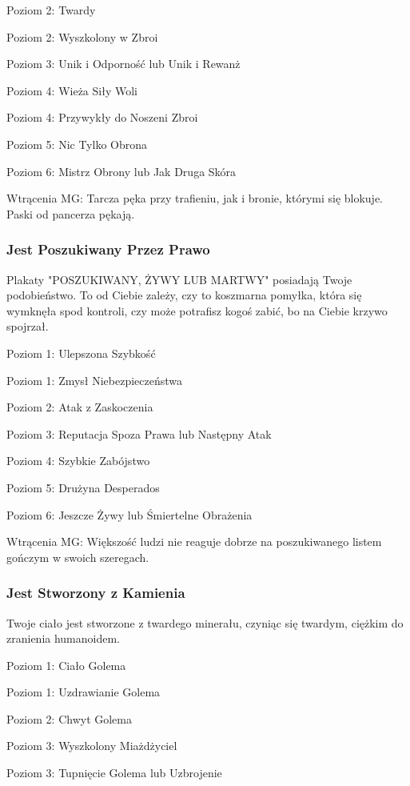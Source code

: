 Poziom 2: Twardy

Poziom 2: Wyszkolony w Zbroi

Poziom 3: Unik i Odporność lub Unik i Rewanż

Poziom 4: Wieża Siły Woli

Poziom 4: Przywykły do Noszeni Zbroi

Poziom 5: Nic Tylko Obrona

Poziom 6: Mistrz Obrony lub Jak Druga Skóra

Wtrącenia MG: Tarcza pęka przy trafieniu, jak i bronie, którymi się blokuje. Paski od pancerza pękają.

\subsubsection{Jest Poszukiwany Przez Prawo}

Plakaty "POSZUKIWANY, ŻYWY LUB MARTWY" posiadają Twoje podobieństwo. To od Ciebie zależy, czy to koszmarna pomyłka, która się wymknęła spod kontroli, czy może potrafisz kogoś zabić, bo na Ciebie krzywo spojrzał. 

Poziom 1: Ulepszona Szybkość

Poziom 1: Zmysł Niebezpieczeństwa

Poziom 2: Atak z Zaskoczenia

Poziom 3: Reputacja Spoza Prawa lub Następny Atak

Poziom 4: Szybkie Zabójstwo

Poziom 5: Drużyna Desperados

Poziom 6: Jeszcze Żywy lub Śmiertelne Obrażenia

Wtrącenia MG: Większość ludzi nie reaguje dobrze na poszukiwanego listem gończym w swoich szeregach.

\subsubsection{Jest Stworzony z Kamienia}

Twoje ciało jest stworzone z twardego minerału, czyniąc się twardym, ciężkim do zranienia humanoidem.

Poziom 1: Ciało Golema

Poziom 1: Uzdrawianie Golema

Poziom 2: Chwyt Golema

Poziom 3: Wyszkolony Miażdżyciel

Poziom 3: Tupnięcie Golema lub Uzbrojenie


